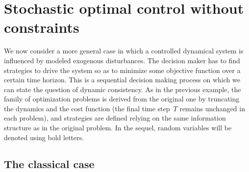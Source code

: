 \documentclass[a4paper]{amsart}
\theoremstyle{plain}
\theoremstyle{definition}
\theoremstyle{remark}
\begin{document}
\section{Stochastic optimal control without constraints} \label{sec:Sto}

We now consider a more general case in which a controlled
dynamical system is influenced by modeled exogenous disturbances.
The decision maker has to find strategies to drive the system so
as to minimize some objective function over a certain time
horizon. This is a sequential decision making process on which we
can state the question of dynamic consistency. As in the previous
example, the family of optimization problems is derived from the
original one by truncating the dynamics and the cost function (the
final time step~$T$ remains unchanged in each problem), and
strategies are defined relying on the same information structure
as in the original problem. In the sequel, random variables will
be denoted using bold letters.

\subsection{The classical case} \label{ssec:Classical}
\end{document}
